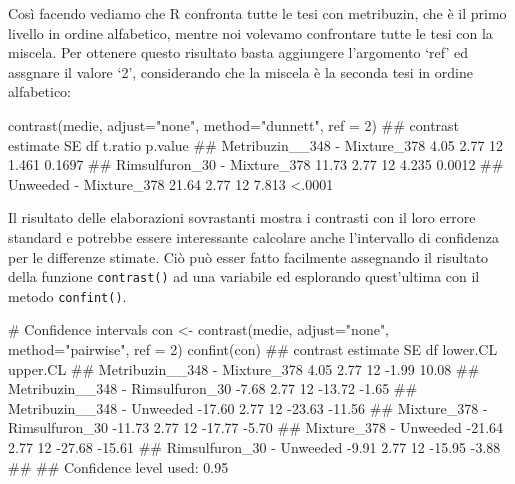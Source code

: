 \documentclass[a4paper,12pt,oneside]{book}
\newenvironment{Shaded}{\begin{snugshade}}{\end{snugshade}}
\newcommand{\DecValTok}[1]{#1}
\newcommand{\StringTok}[1]{#1}
\newcommand{\CommentTok}[1]{#1}
\newcommand{\DocumentationTok}[1]{#1}
\newcommand{\OtherTok}[1]{#1}
\newcommand{\FunctionTok}[1]{#1}
\newcommand{\AttributeTok}[1]{#1}
\newcommand{\NormalTok}[1]{#1}
\begin{document}
\normalsize

Così facendo vediamo che R confronta tutte le tesi con metribuzin, che è il primo livello in ordine alfabetico, mentre noi volevamo confrontare tutte le tesi con la miscela. Per ottenere questo risultato basta aggiungere l'argomento `ref' ed assgnare il valore `2', considerando che la miscela è la seconda tesi in ordine alfabetico:

\small

\begin{Shaded}
\begin{Highlighting}[]
\FunctionTok{contrast}\NormalTok{(medie, }\AttributeTok{adjust=}\StringTok{"none"}\NormalTok{, }\AttributeTok{method=}\StringTok{"dunnett"}\NormalTok{, }\AttributeTok{ref =} \DecValTok{2}\NormalTok{)}
\DocumentationTok{\#\#  contrast                      estimate   SE df t.ratio p.value}
\DocumentationTok{\#\#  Metribuzin\_\_348 {-} Mixture\_378     4.05 2.77 12   1.461  0.1697}
\DocumentationTok{\#\#  Rimsulfuron\_30 {-} Mixture\_378     11.73 2.77 12   4.235  0.0012}
\DocumentationTok{\#\#  Unweeded {-} Mixture\_378           21.64 2.77 12   7.813  \textless{}.0001}
\end{Highlighting}
\end{Shaded}

\normalsize

Il risultato delle elaborazioni sovrastanti mostra i contrasti con il loro errore standard e potrebbe essere interessante calcolare anche l'intervallo di confidenza per le differenze stimate. Ciò può esser fatto facilmente assegnando il risultato della funzione \texttt{contrast()} ad una variabile ed esplorando quest'ultima con il metodo \texttt{confint()}.

\small

\begin{Shaded}
\begin{Highlighting}[]
\CommentTok{\# Confidence intervals}
\NormalTok{con }\OtherTok{\textless{}{-}} \FunctionTok{contrast}\NormalTok{(medie, }\AttributeTok{adjust=}\StringTok{"none"}\NormalTok{, }
                \AttributeTok{method=}\StringTok{"pairwise"}\NormalTok{, }\AttributeTok{ref =} \DecValTok{2}\NormalTok{)}
\FunctionTok{confint}\NormalTok{(con)}
\DocumentationTok{\#\#  contrast                         estimate   SE df lower.CL upper.CL}
\DocumentationTok{\#\#  Metribuzin\_\_348 {-} Mixture\_378        4.05 2.77 12    {-}1.99    10.08}
\DocumentationTok{\#\#  Metribuzin\_\_348 {-} Rimsulfuron\_30    {-}7.68 2.77 12   {-}13.72    {-}1.65}
\DocumentationTok{\#\#  Metribuzin\_\_348 {-} Unweeded         {-}17.60 2.77 12   {-}23.63   {-}11.56}
\DocumentationTok{\#\#  Mixture\_378 {-} Rimsulfuron\_30       {-}11.73 2.77 12   {-}17.77    {-}5.70}
\DocumentationTok{\#\#  Mixture\_378 {-} Unweeded             {-}21.64 2.77 12   {-}27.68   {-}15.61}
\DocumentationTok{\#\#  Rimsulfuron\_30 {-} Unweeded           {-}9.91 2.77 12   {-}15.95    {-}3.88}
\DocumentationTok{\#\# }
\DocumentationTok{\#\# Confidence level used: 0.95}
\end{Highlighting}
\end{Shaded}
\end{document}
